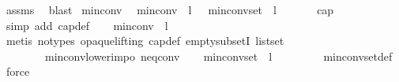 \begin{isabellebody}
\ assms\ \isamarkupfalse%
\ blast%
\endisatagproof
{\isafoldproof}%
%
\isadelimproof
\isanewline
%
\endisadelimproof
\isanewline
{}\isamarkupfalse%
\ min{\isacharunderscore}{\kern0pt}conv{\isacharunderscore}{\kern0pt}{}{\isacharcolon}{\kern0pt}\isanewline
\ \ {\isachardoublequoteopen}min{\isacharunderscore}{\kern0pt}conv\ {}\ l\ {\isacharequal}{\kern0pt}\ {}{\isachardoublequoteclose}\ {\isachardoublequoteopen}min{\isacharunderscore}{\kern0pt}conv{\isacharunderscore}{\kern0pt}set\ {}\ l\ {\isasymnoteq}\ {\isacharbraceleft}{\kern0pt}{\isacharbraceright}{\kern0pt}{\isachardoublequoteclose}\ \isanewline
%
\isadelimproof
%
\endisadelimproof
%
\isatagproof
{}\isamarkupfalse%
{\isacharminus}{\kern0pt}\isanewline
\ \ \isamarkupfalse%
\ {}{\isacharcolon}{\kern0pt}{\isachardoublequoteopen}cap\ {}\ {\isacharbrackleft}{\kern0pt}{\isacharbrackright}{\kern0pt}{\isachardoublequoteclose}\isanewline
\ \ \ \ \isamarkupfalse%
\ {\isacharparenleft}{\kern0pt}simp\ add{\isacharcolon}{\kern0pt}\ cap{\isacharunderscore}{\kern0pt}def{\isacharparenright}{\kern0pt}\isanewline
\ \ \isamarkupfalse%
\ {\isachardoublequoteopen}min{\isacharunderscore}{\kern0pt}conv\ {}\ l\ {\isacharequal}{\kern0pt}\ {}{\isachardoublequoteclose}\isanewline
\ \ \ \ \isamarkupfalse%
\ {\isacharparenleft}{\kern0pt}metis\ {\isacharparenleft}{\kern0pt}no{\isacharunderscore}{\kern0pt}types{\isacharcomma}{\kern0pt}\ opaque{\isacharunderscore}{\kern0pt}lifting{\isacharparenright}{\kern0pt}\ cap{\isacharunderscore}{\kern0pt}def\ empty{\isacharunderscore}{\kern0pt}subsetI\ list{\isachardot}{\kern0pt}set{\isacharparenleft}{\kern0pt}{}{\isacharparenright}{\kern0pt}\isanewline
\ \ \ \ \ \ \ \ min{\isacharunderscore}{\kern0pt}conv{\isacharunderscore}{\kern0pt}lower{\isacharunderscore}{\kern0pt}imp{}o\ neq{}{\isacharunderscore}{\kern0pt}conv{\isacharparenright}{\kern0pt}\isanewline
\ \ \isamarkupfalse%
\ {\isachardoublequoteopen}min{\isacharunderscore}{\kern0pt}conv{\isacharunderscore}{\kern0pt}set\ {}\ l\ {\isasymnoteq}\ {\isacharbraceleft}{\kern0pt}{\isacharbraceright}{\kern0pt}{\isachardoublequoteclose}\isanewline
\ \ \ \ \isamarkupfalse%
\ {}\ min{\isacharunderscore}{\kern0pt}conv{\isacharunderscore}{\kern0pt}set{\isacharunderscore}{\kern0pt}def\ \isamarkupfalse%
\ force\isanewline

\end{isabellebody}
